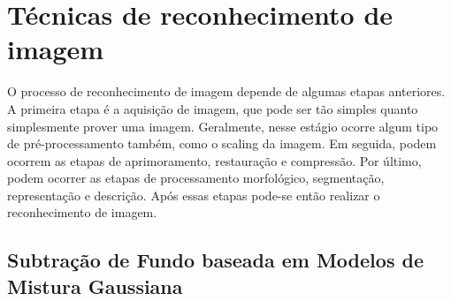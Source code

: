 \documentclass[12pt, %
openright, 
oneside, %
a4paper,    %
brazil]{facom-ufu-abntex2}
\begin{document}



\section{Técnicas de reconhecimento de imagem}
O processo de reconhecimento de imagem depende de algumas etapas anteriores. A
primeira etapa é a aquisição de imagem, que pode ser tão simples quanto
simplesmente prover uma imagem. Geralmente, nesse estágio ocorre algum tipo de
pré-processamento também, como o  scaling da imagem. Em seguida, podem ocorrem
as etapas de aprimoramento, restauração e compressão. Por último, podem ocorrer
as etapas de processamento morfológico, segmentação, representação e descrição.
Após essas etapas pode-se então realizar o reconhecimento de imagem.
\cite{gonzalez2002digital}

\subsection{Subtração de Fundo baseada em Modelos de Mistura Gaussiana}
\end{document}
